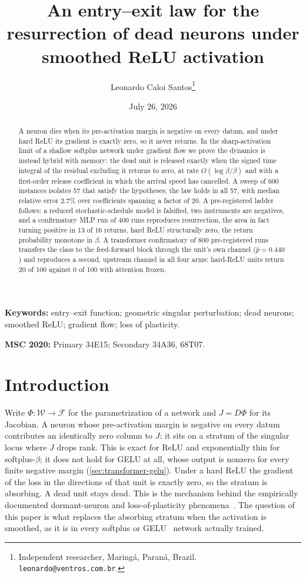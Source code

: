 \documentclass[11pt]{article}
\title{An entry--exit law for the resurrection of dead neurons
under smoothed ReLU activation}
\author{Leonardo Caloi Santos\thanks{Independent researcher, Maring\'a,
Paran\'a, Brazil. \texttt{leonardo@ventros.com.br}.}}
\date{July 26, 2026}
\theoremstyle{definition}
\theoremstyle{remark}
\begin{document}
\maketitle

\begin{abstract}
A neuron dies when its pre-activation margin is negative on every datum, and
under hard ReLU its gradient is exactly zero, so it never returns. In the
sharp-activation limit of a shallow softplus network under gradient flow we
prove the dynamics is instead hybrid with memory: the dead unit is
released exactly when the signed time integral of the residual excluding it
returns to zero, at rate $O(\log\beta/\beta)$ and with a first-order release
coefficient in which the arrival speed has cancelled. A sweep of 600
instances isolates 57 that satisfy the hypotheses; the law holds in all 57,
with median relative error $2.7\%$ over coefficients spanning a factor of 20. A
pre-registered ladder follows: a reduced stochastic-schedule model is
falsified, two instruments are negatives, and a confirmatory MLP
run of 400 runs reproduces resurrection, the area in fact turning positive in
13 of 16 returns, hard ReLU structurally zero, the return probability monotone in
$\beta$. A transformer confirmatory of 800 pre-registered runs
transfers the class to the feed-forward block through the unit's own channel
($\hat p=0.440$) and reproduces a second, upstream channel in all four arms:
hard-ReLU units return 20 of 100 against 0 of 100 with attention frozen.
\end{abstract}

\noindent\textbf{Keywords:} entry--exit function; geometric singular
perturbation; dead neurons; smoothed ReLU; gradient flow; loss of plasticity.

\smallskip
\noindent\textbf{MSC 2020:} Primary 34E15; Secondary 34A36, 68T07.

\section{Introduction}\label{sec:intro}

Write $\Phi:\mathcal{W}\to\mathcal{F}$ for the parametrization of a network and
$J=D\Phi$ for its Jacobian. A neuron whose pre-activation margin is negative on
every datum contributes an identically zero column to $J$: it sits on a stratum
of the singular locus where $J$ drops rank. This is exact for ReLU and
exponentially thin for softplus-$\beta$; it does not hold for GELU at all, whose
output is nonzero for every finite negative margin (\cref{sec:transformer-gelu}).
Under a hard ReLU the gradient of the
loss in the directions of that unit is exactly zero, so the stratum is absorbing.
A dead unit stays dead. This is the mechanism behind the empirically documented
dormant-neuron and loss-of-plasticity
phenomena~\cite{Sokar23,Lyle23,Dohare24}. The question of this paper is what
replaces the absorbing stratum when the activation is smoothed, as it is in every
softplus or GELU~\cite{HG16} network actually trained.
\end{document}
